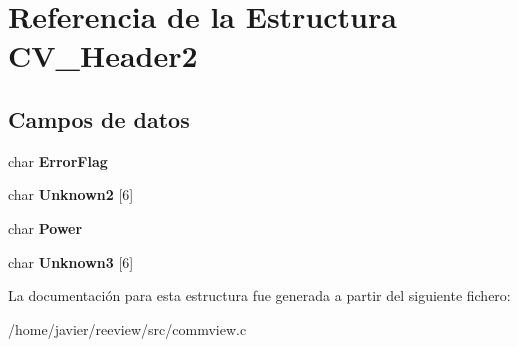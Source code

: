 \hypertarget{struct_c_v___header2}{
\section{Referencia de la Estructura CV\_\-Header2}
\label{struct_c_v___header2}
}
\subsection*{Campos de datos}
\begin{DoxyCompactItemize}
\item 
\hypertarget{struct_c_v___header2_a662ebd84f408923a9f635cdc69ea9f4c}{
char {\bfseries ErrorFlag}}
\label{struct_c_v___header2_a662ebd84f408923a9f635cdc69ea9f4c}

\item 
\hypertarget{struct_c_v___header2_a4697a89e8e3b5ca7a7b0728151c0f317}{
char {\bfseries Unknown2} \mbox{[}6\mbox{]}}
\label{struct_c_v___header2_a4697a89e8e3b5ca7a7b0728151c0f317}

\item 
\hypertarget{struct_c_v___header2_a2e8d143c7a91d7bd575b0cda061db7bb}{
char {\bfseries Power}}
\label{struct_c_v___header2_a2e8d143c7a91d7bd575b0cda061db7bb}

\item 
\hypertarget{struct_c_v___header2_ac2f4789dd9d4ed9f96e4a0bb4b2856ff}{
char {\bfseries Unknown3} \mbox{[}6\mbox{]}}
\label{struct_c_v___header2_ac2f4789dd9d4ed9f96e4a0bb4b2856ff}

\end{DoxyCompactItemize}


La documentación para esta estructura fue generada a partir del siguiente fichero:\begin{DoxyCompactItemize}
\item 
/home/javier/reeview/src/commview.c\end{DoxyCompactItemize}
